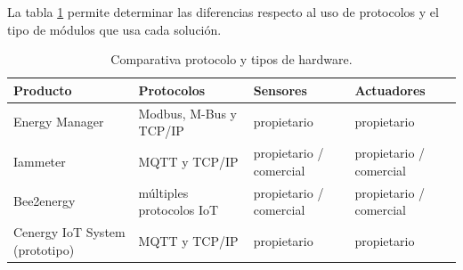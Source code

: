 
La tabla \ref{tab:tabla-resultado2} permite determinar las diferencias respecto al uso de protocolos y el tipo de módulos que usa cada solución. 


\begin{table}[h]
	\centering
	\caption[Comparativa de soluciones entre protocolo y hardware]{Comparativa protocolo y tipos de hardware.}
	\begin{tabular}{p{4cm} p{3cm} p{2cm} p{2cm}}    
		\toprule
		\textbf{Producto} 	 & \textbf{Protocolos}  & \textbf{Sensores} & \textbf{Actuadores}  \\
		\midrule
		Energy Manager & Modbus, M-Bus y TCP/IP & propietario & propietario \\		
		Iammeter	 & MQTT y TCP/IP	& propietario / comercial & propietario / comercial   \\
		Bee2energy	 & múltiples protocolos IoT		& propietario / comercial & propietario / comercial \\
		Cenergy IoT	System (prototipo) & MQTT y TCP/IP	& propietario & propietario  \\
		\bottomrule
		\hline
	\end{tabular}
	\label{tab:tabla-resultado2}
\end{table}
